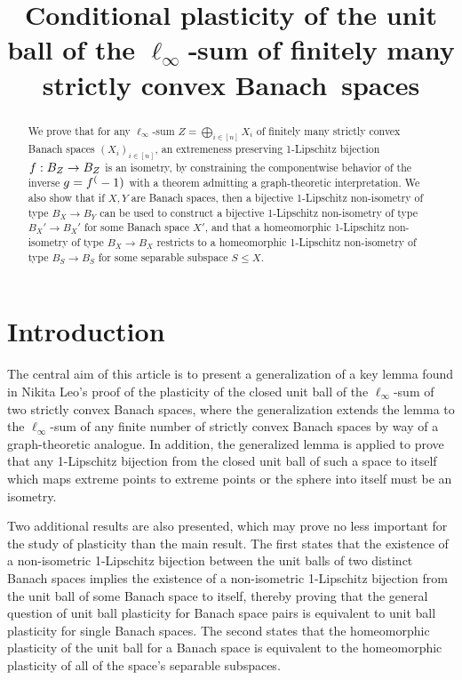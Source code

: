 \documentclass{amsart}
\title{Conditional plasticity of the unit ball of the \(\ell_\infty\)‑sum of finitely many strictly convex Banach~spaces}
\begin{document}
\begin{abstract}
    We prove that for any $\ell_\infty$-sum $Z = \bigoplus_{i \in [n]} X_i$ of finitely many strictly
    convex Banach spaces $(X_i)_{i \in [n]}$, an extremeness preserving 1-Lipschitz bijection
    $f: B_Z \to B_Z$ is an isometry, by constraining the componentwise behavior of the inverse
    $g=f^(-1)$ with a theorem admitting a graph-theoretic interpretation.
    We also show that if $X, Y$ are Banach spaces, then a bijective 1-Lipschitz non-isometry of
    type $B_X \to B_Y$ can be used to construct a bijective 1-Lipschitz non-isometry of type
    $B_X' \to B_X'$ for some Banach space $X'$, and that a homeomorphic 1-Lipschitz non-isometry of
    type $B_X \to B_X$ restricts to a homeomorphic 1-Lipschitz non-isometry of type
    $B_S \to B_S$ for some separable subspace $S \leq X$.
\end{abstract}

\maketitle

\section{Introduction}

The central aim of this article is to present a generalization of a key lemma
found in Nikita Leo's proof of the plasticity of the closed unit ball of
the $\ell_\infty$-sum of two strictly convex Banach spaces, where the generalization
extends the lemma to the $\ell_\infty$-sum of any finite number of strictly convex Banach
spaces by way of a graph-theoretic analogue. In addition, the generalized lemma is applied to prove that any 1-Lipschitz bijection from
the closed unit ball of such a space to itself
which maps extreme points to extreme points
or the sphere into itself must be an isometry.

Two additional results are also presented, which may prove no less important for the study of plasticity than the main result. The first states that the existence of a non-isometric 1-Lipschitz bijection between the unit balls of two distinct Banach spaces implies the existence of a non-isometric 1-Lipschitz bijection from the unit ball of some Banach space to itself, thereby proving that the general question of unit ball plasticity for Banach space pairs is equivalent to unit ball plasticity for single Banach spaces. The second states that the homeomorphic plasticity of the unit ball for a Banach space is equivalent to the homeomorphic plasticity of all of the space's separable subspaces.
\end{document}
